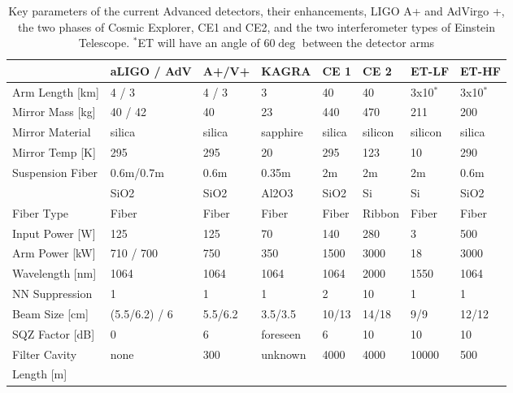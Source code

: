 \begin{table}[ht]
\centering
\begin{tabular}{|l|l|l|p{1.6cm}|l|l|l|l|}
\hline
 &aLIGO / AdV &A+/V+ &KAGRA &CE 1 &CE 2 &ET-LF &ET-HF\\
\hline
Arm Length [km] & 4 / 3 &4 / 3& 3& 40& 40& 3x10$^*$ & 3x10$^*$\\
\hline
Mirror Mass [kg]& 40 / 42& 40& 23& 440& 470& 211& 200\\
\hline
Mirror Material& silica& silica& sapphire& silica& silicon& silicon& silica\\
\hline
Mirror Temp [K]& 295& 295& 20& 295& 123& 10& 290\\
\hline
Suspension Fiber& 0.6m/0.7m& 0.6m& 0.35m& 2m& 2m& 2m& 0.6m\\
& SiO2& SiO2&Al2O3&SiO2&Si&Si&SiO2\\
\hline
Fiber Type& Fiber& Fiber& Fiber& Fiber& Ribbon& Fiber& Fiber\\
\hline
Input Power [W]& 125& 125& 70& 140& 280& 3& 500\\
\hline
Arm Power [kW]& 710 / 700& 750& 350& 1500& 3000& 18& 3000\\
\hline
Wavelength [nm]& 1064& 1064& 1064& 1064& 2000& 1550& 1064\\
\hline
\acs{NN} Suppression& 1& 1& 1& 2& 10& 1& 1\\
\hline
Beam Size [cm]& (5.5/6.2) / 6& 5.5/6.2& 3.5/3.5& 10/13& 14/18& 9/9& 12/12\\
\hline
\acs{SQZ} Factor [dB]& 0& 6& foreseen& 6& 10& 10& 10\\
\hline
Filter Cavity & none& 300& unknown& 4000& 4000& 10000& 500\\
Length [m] &&&&&&&\\
\hline
\end{tabular}
\caption{Key parameters of the current Advanced detectors, their enhancements, LIGO A+ and AdVirgo +, the two phases of Cosmic Explorer, \ac{CE1} and \ac{CE2}, and the two interferometer types of Einstein Telescope. $^*$\ac{ET} will have an angle of 60$\deg$ between the detector arms}
\label{Tab:FutIfos}
\end{table}

